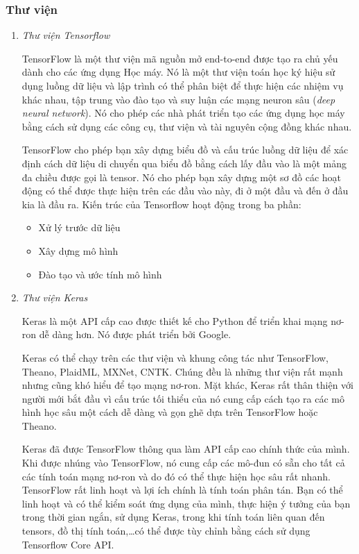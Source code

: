 \subsubsection{Thư viện}
\begin{enumerate}
    \item \textit{Thư viện Tensorflow}

          TensorFlow là một thư viện mã nguồn mở end-to-end được tạo ra chủ yếu dành cho các ứng dụng Học máy. Nó là một thư viện toán học ký hiệu sử dụng luồng dữ liệu và lập trình có thể phân biệt để thực hiện các nhiệm vụ khác nhau, tập trung vào đào tạo và suy luận các mạng neuron sâu (\textit{deep neural network}). Nó cho phép các nhà phát triển tạo các ứng dụng học máy bằng cách sử dụng các công cụ, thư viện và tài nguyên cộng đồng khác nhau\cite{webpage16}.

          TensorFlow cho phép bạn xây dựng biểu đồ và cấu trúc luồng dữ liệu để xác định cách dữ liệu di chuyển qua biểu đồ bằng cách lấy đầu vào là một mảng đa chiều được gọi là tensor. Nó cho phép bạn xây dựng một sơ đồ các hoạt động có thể được thực hiện trên các đầu vào này, đi ở một đầu và đến ở đầu kia là đầu ra.
          Kiến trúc của Tensorflow hoạt động trong ba phần:
          \begin{itemize}
              \item Xử lý trước dữ liệu
              \item Xây dựng mô hình
              \item Đào tạo và ước tính mô hình
          \end{itemize}

    \item \textit{Thư viện Keras}

          Keras là một API cấp cao được thiết kế cho Python để triển khai mạng nơ-ron dễ dàng hơn. Nó được phát triển bởi Google.

          Keras có thể chạy trên các thư viện và khung công tác như TensorFlow, Theano, PlaidML, MXNet, CNTK. Chúng đều là những thư viện rất mạnh nhưng cũng khó hiểu để tạo mạng nơ-ron. Mặt khác, Keras rất thân thiện với người mới bắt đầu vì cấu trúc tối thiểu của nó cung cấp cách tạo ra các mô hình học sâu một cách dễ dàng và gọn ghẽ dựa trên TensorFlow hoặc Theano.

          Keras đã được TensorFlow thông qua làm API cấp cao chính thức của mình. Khi được nhúng vào TensorFlow, nó cung cấp các mô-đun có sẵn cho tất cả các tính toán mạng nơ-ron và do đó có thể thực hiện học sâu rất nhanh. TensorFlow rất linh hoạt và lợi ích chính là tính toán phân tán. Bạn có thể linh hoạt và có thể kiểm soát ứng dụng của mình, thực hiện ý tưởng của bạn trong thời gian ngắn, sử dụng Keras, trong khi tính toán liên quan đến tensors, đồ thị tính toán,\dots có thể được tùy chỉnh bằng cách sử dụng Tensorflow Core API.


\end{enumerate}
